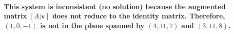 \documentclass[11pt]{article} %
\begin{document}
\begin{mdframed}
    \paragraph{This system is inconsistent (no solution) because the augmented matrix \([A | \mathbf{v}]\) does not reduce to the identity matrix. Therefore, \( (1, 0, -1) \) is not in the plane spanned by \( (4, 11, 7) \) and \( (3, 11, 8) \).}
\end{mdframed}
















% 
% 
% 
\end{document}
